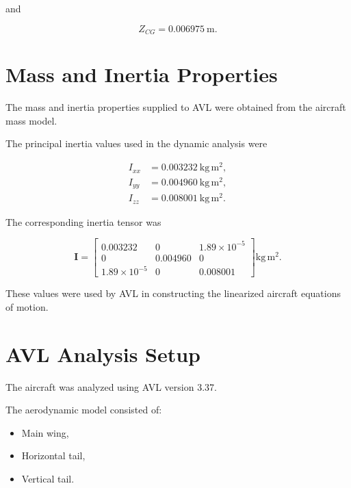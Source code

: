 \documentclass[11pt,a4paper]{article}
\begin{document}
and

\begin{equation}
Z_{CG}=0.006975~\mathrm{m}.
\end{equation}

\section{Mass and Inertia Properties}

The mass and inertia properties supplied to AVL were obtained from the
aircraft mass model.

The principal inertia values used in the dynamic analysis were

\begin{align}
I_{xx} &= 0.003232~\mathrm{kg\,m^2},\\
I_{yy} &= 0.004960~\mathrm{kg\,m^2},\\
I_{zz} &= 0.008001~\mathrm{kg\,m^2}.
\end{align}

The corresponding inertia tensor was

\begin{equation}
\mathbf{I}
=
\begin{bmatrix}
0.003232 & 0 & 1.89\times10^{-5}\\
0 & 0.004960 & 0\\
1.89\times10^{-5} & 0 & 0.008001
\end{bmatrix}
\mathrm{kg\,m^2}.
\end{equation}

These values were used by AVL in constructing the linearized aircraft
equations of motion.

\section{AVL Analysis Setup}

The aircraft was analyzed using AVL version 3.37.

The aerodynamic model consisted of:

\begin{itemize}
    \item Main wing,
    \item Horizontal tail,
    \item Vertical tail.
\end{itemize}
\end{document}
